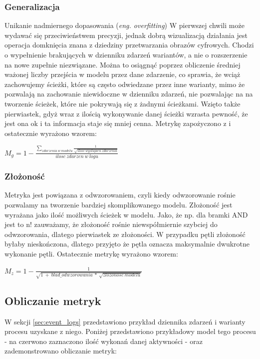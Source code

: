 \subsubsection{Generalizacja}
Unikanie nadmiernego dopasowania (\textit{eng. overfitting})
W pierwszej chwili może wydawać się przeciwieństwem precyzji, jednak dobrą wizualizacją działania jest operacja domknięcia znana z dziedziny przetwarzania obrazów cyfrowych. Chodzi o wypełnienie brakujących w dzienniku zdarzeń wariantów, a nie o rozszerzenie na nowe zupełnie niezwiązane. Można to osiągnąć poprzez obliczenie średniej ważonej liczby przejścia w modelu przez dane zdarzenie, co sprawia, że wciąż zachowujemy ścieżki, które są często odwiedzane przez inne warianty, mimo że pozwalają na zachowanie niewidoczne w dzienniku zdarzeń, nie pozwalając na na tworzenie ścieżek, które nie pokrywają się z żadnymi ścieżkami. Wzięto także pierwiastek, gdyż wraz z ilością wykonywanie danej ścieżki wzrasta pewność, że jest ona ok i ta informacja staje się mniej cenna. Metrykę zapożyczono z \cite{qd-in-discovery} i ostatecznie wyrażono wzorem:
\begin{center}
$M_g = 1 - \frac{\sum_{zdarzenia\ w\ modelu} \frac{1}{\sqrt{ilosc\ wystapien\ zdarzenia}}}{ilosc\ zdarzen\ w\ logu} $
\end{center}
\subsubsection{Złożoność}
Metryka jest powiązana z odwzorowaniem, czyli kiedy odwzorowanie rośnie pozwalamy na tworzenie bardziej skomplikowanego modelu. Złożoność jest wyrażana jako ilość możliwych ścieżek w modelu. Jako, że np. dla bramki AND jest to n! zauważamy, że złożoność rośnie niewspółmiernie szybciej do odwzorowania, dlatego pierwiastek ze złożoności. W przypadku pętli złożoność byłaby nieskończona, dlatego przyjęto że pętla oznacza maksymalnie dwukrotne wykonanie pętli. Ostatecznie metrykę wyrażono wzorem: \begin{center}
$M_z = 1 - \frac{1}{\sqrt{1\ +\ blad\_odwzorowania\ *\ \sqrt{zlozonosc\ modelu}}} $
\end{center}
\newpage
\subsection{Obliczanie metryk}
W sekcji \ref{sec:event_logs} przedstawiono przykład dziennika zdarzeń i warianty procesu uzyskane z niego. Poniżej przedstawiono przykładowy model tego procesu - na czerwono zaznaczono ilość wykonań danej aktywności - oraz zademonstrowano obliczanie metryk:

